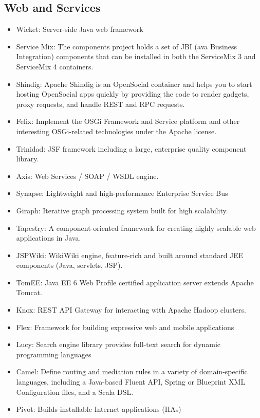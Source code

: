 \documentclass[12pt]{report}
\providecommand{\tightlist}{%
  \setlength{\itemsep}{0pt}\setlength{\parskip}{0pt}}
\begin{document}
\subsection{Web and Services}\label{web-and-services}

\begin{itemize}
\tightlist
\item
  Wicket: Server-side Java web framework
\item
  Service Mix: The components project holds a set of JBI (ava Business
  Integration) components that can be installed in both the ServiceMix 3
  and ServiceMix 4 containers.
\item
  Shindig: Apache Shindig is an OpenSocial container and helps you to
  start hosting OpenSocial apps quickly by providing the code to render
  gadgets, proxy requests, and handle REST and RPC requests.
\item
  Felix: Implement the OSGi Framework and Service platform and other
  interesting OSGi-related technologies under the Apache license.
\item
  Trinidad: JSF framework including a large, enterprise quality
  component library.
\item
  Axis: Web Services / SOAP / WSDL engine.
\item
  Synapse: Lightweight and high-performance Enterprise Service Bus
\item
  Giraph: Iterative graph processing system built for high scalability.
\item
  Tapestry: A component-oriented framework for creating highly scalable
  web applications in Java.
\item
  JSPWiki: WikiWiki engine, feature-rich and built around standard JEE
  components (Java, servlets, JSP).
\item
  TomEE: Java EE 6 Web Profile certified application server extends
  Apache Tomcat.
\item
  Knox: REST API Gateway for interacting with Apache Hadoop clusters.
\item
  Flex: Framework for building expressive web and mobile applications
\item
  Lucy: Search engine library provides full-text search for dynamic
  programming languages
\item
  Camel: Define routing and mediation rules in a variety of
  domain-specific languages, including a Java-based Fluent API, Spring
  or Blueprint XML Configuration files, and a Scala DSL.
\item
  Pivot: Builds installable Internet applications (IIAs)

\end{itemize}
\end{document}
